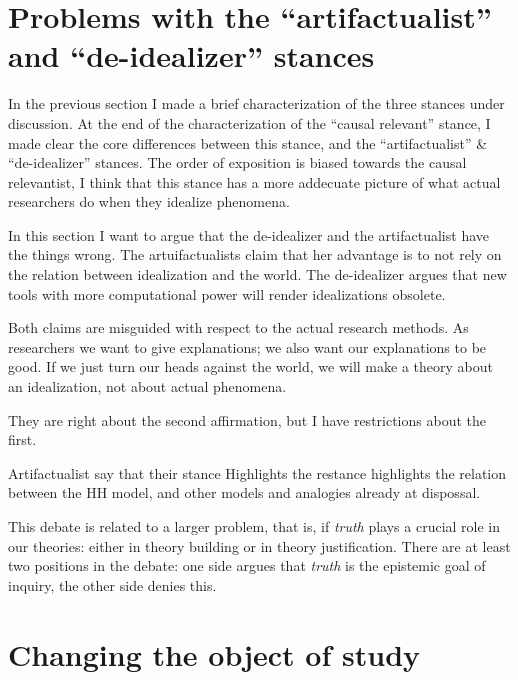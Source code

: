 \section{Problems with the ``artifactualist'' and ``de-idealizer'' stances}

In the previous section I made a brief characterization of the three stances under discussion.
At the end of the characterization of the ``causal relevant'' stance, I made clear the core differences between this stance, and the ``artifactualist'' \& ``de-idealizer'' stances.
The order of exposition is biased towards the causal relevantist, I think that this stance has a more addecuate picture of what actual researchers do when they idealize phenomena.

In this section I want to argue that the de-idealizer and the artifactualist have the things wrong.
The artuifactualists claim that her advantage is to not rely on the relation between idealization and the world.
The de-idealizer argues that new tools with more computational power will render idealizations obsolete.

Both claims are misguided with respect to the actual research methods.
As researchers we want to give explanations; we also want our explanations to be good.
If we just turn our heads against the world, we will make a theory about an idealization, not about actual phenomena.









They are right about the second affirmation, but I have restrictions about the first.



Artifactualist say that their stance Highlights the restance highlights the relation between the HH model, and other models and analogies already at dispossal.








This debate is related to a larger problem, that is, if \emph{truth} plays a crucial role in our theories: either in theory building or in theory justification.
There are at least two positions in the debate: one side argues that \emph{truth} is the epistemic goal of inquiry, the other side denies this.






\section{Changing the object of study}

